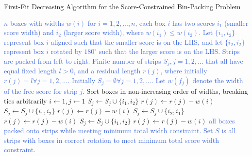 \documentclass[oribibl]{llncs}
\begin{document}
\begin{algorithm}[H]
	\caption{\textcolor{OliveGreen}{First-Fit Decreasing Algorithm for the Score-Constrained Bin-Packing Problem}}
	\label{alg:ffdapprox}
	\begin{algorithmic}[1]
	\Require \textcolor{RoyalBlue}{$n$ boxes with widths $w(i)$ for $i = 1,2,...,n$, each box $i$ has two scores $i_1$ (smaller score width) and $i_2$ (larger score width), where $w(i_1) \leq w(i_2)$. Let $\{i_1, i_2\}$ represent box $i$ aligned such that the smaller score is on the LHS, and let $\{i_2, i_2\}$ represent box $i$ rotated by $180^{\circ}$ such that the larger score is on the LHS. Strips are packed from left to right. Finite number of strips $S_j, j = 1, 2, ...$ that all have equal fixed length $l > 0$, and a residual length $r(j)$, where initially $r(j) = l \forall j = 1, 2, ...$. Initially $S_j = \emptyset \forall j = 1, 2,...$. Let $w(f_j)$ denote the width of the free score for strip $j$.}   
	\State Sort boxes in non-increasing order of widths, breaking ties arbitrarily
	\State $i \gets 1, j \gets 1$
	\State $S_j \gets S_j \cup \{i_1, i_2\}$
	\State $r(j) \gets r(j) - w(i)$
					\State $S_j \gets S_j \cup \{i_1, i_2\}$
					\State $r(j) \gets r(j) - w(i)$
					\State \Break
					\State $S_j \gets S_j \cup \{i_2, i_1\}$
					\State $r(j) \gets r(j) - w(i)$
					\State \Break					
				\EndIf
				\State $S_j \gets S_j \cup \{i_1, i_2\}$
				\State $r(j) \gets r(j) - w(i)$
				\State \Break
			\EndIf
		\EndFor
	\EndFor		
	\Ensure \textcolor{RoyalBlue}{all boxes packed onto strips while meeting minimum total width constraint. Set $S$ is all strips with boxes in correct rotation to meet minimum total score width constraint.}	
	\end{algorithmic}	
\end{algorithm}
\end{document}
